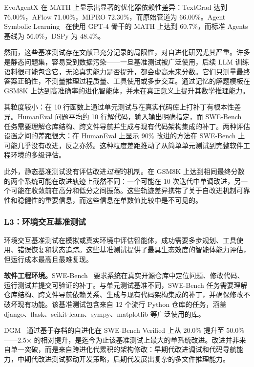 EvoAgentX 在 MATH 上显示出显著的优化器依赖性差异：TextGrad 达到 76.00\%，AFlow 71.00\%，MIPRO 72.30\%，而原始管道为 66.00\%。Agent Symbolic Learning~\citep{agentsymboliclearning2024} 在使用 GPT-4 骨干的 MATH 上达到 60.7\%，而标准 Agents 基线为 56.0\%，DSPy 为 48.4\%。

然而，这些基准测试存在文献已充分记录的局限性，对自进化研究尤其严重。许多是静态问题集，容易受到数据污染——一旦基准测试被广泛使用，后续 LLM 训练语料很可能包含它，无论真实能力是否提升，都会虚高未来分数。它们只测量最终答案正确性，不测量推理过程质量、工具使用或多步交互。通过记忆的解题模板在 GSM8K 上达到高准确率的进化智能体，并未在真正意义上提升其数学推理能力。

其粒度较小：在 10 行函数上通过单元测试与在真实代码库上打补丁有根本性差异。HumanEval 问题平均约 10 行解代码，输入输出明确指定，而 SWE-Bench 任务需要理解仓库结构、跨文件导航并生成与现有代码架构集成的补丁。两种评估设置之间的差距很大：在 HumanEval 上显示 90\% 改进的方法在 SWE-Bench 上可能几乎没有改进，反之亦然。这种粒度差距推动了从简单单元测试到完整软件工程环境的多级评估。

此外，静态基准测试没有评估改进\emph{过程}的机制。在 GSM8K 上达到相同最终分数的两个系统可能在改进轨迹上截然不同：一个可能在 10 次迭代中单调改进，另一个可能在收敛前在高分和低分之间振荡。这些轨迹差异携带了关于自改进机制可靠性和稳健性的重要信息，而这些信息在单数值比较中是不可见的。


\subsubsection{L3：环境交互基准测试}
\label{sec:eval-L3}

环境交互基准测试在模拟或真实环境中评估智能体，成功需要多步规划、工具使用、错误恢复和状态追踪。这些基准测试提供了最具生态效度的智能体能力评估，但运行成本最高且最难复现。

\textbf{软件工程环境。}SWE-Bench~\citep{jimenez2024swebench} 要求系统在真实开源仓库中定位问题、修改代码、运行测试并提交可验证的补丁。与单元测试基准不同，SWE-Bench 任务需要理解仓库结构、跨文件导航依赖关系、生成与现有代码架构集成的补丁，并确保修改不破坏现有功能。该基准测试包含来自 12 个流行 Python 仓库的任务，涵盖 django、flask、scikit-learn、sympy、matplotlib 等广泛使用的库。

DGM~\citep{darwingodelmachine2025} 通过基于存档的自进化在 SWE-Bench Verified 上从 20.0\% 提升至 50.0\%——2.5$\times$ 的相对提升，是迄今为止该基准测试上最大的单系统改进。改进并非来自单一突破，而是来自跨进化代累积的架构修改：早期代改进调试和代码导航能力，中期代改进测试驱动开发策略，后期代发展出复杂的多文件推理能力。

